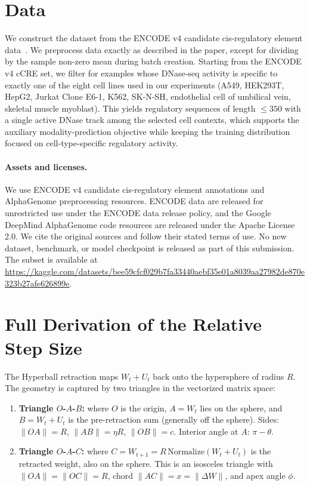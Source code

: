 \documentclass{article}
\begin{document}
\section{Data}
\label{app:data}

We construct the dataset from the ENCODE v4 candidate cis-regulatory element data~\citep{encode-v4}. We preprocess data exactly as described in the paper, except for dividing by the sample non-zero mean during batch creation. Starting from the ENCODE v4 cCRE set, we filter for examples whose DNase-seq activity is specific to exactly one of the eight cell lines used in our experiments (A549, HEK293T, HepG2, Jurkat Clone E6-1, K562, SK-N-SH, endothelial cell of umbilical vein, skeletal muscle myoblast). This yields regulatory sequences of length $\le 350$ with a single active DNase track among the selected cell contexts, which supports the auxiliary modality-prediction objective while keeping the training distribution focused on cell-type-specific regulatory activity.

\paragraph{Assets and licenses.} We use ENCODE v4 candidate cis-regulatory element annotations and AlphaGenome preprocessing resources. ENCODE data are released for unrestricted use under the ENCODE data release policy, and the Google DeepMind AlphaGenome code resources are released under the Apache License 2.0. We cite the original sources and follow their stated terms of use. No new dataset, benchmark, or model checkpoint is released as part of this submission. The subset is available at \url{https://kaggle.com/datasets/bee59cfcf029b7fa33440aebf35e01a8039aa27982de870e323b27afe626899e}.

\section{Full Derivation of the Relative Step Size}
\label{app:derivation}

The Hyperball retraction maps $W_t + U_t$ back onto the hypersphere of radius $R$. The geometry is captured by two triangles in the vectorized matrix space:
\begin{enumerate}
  \item \textbf{Triangle $O$-$A$-$B$:} where $O$ is the origin, $A = W_t$ lies on the sphere, and $B = W_t + U_t$ is the pre-retraction sum (generally off the sphere). Sides: $\|OA\|=R$, $\|AB\|=\eta R$, $\|OB\|=c$. Interior angle at $A$: $\pi-\theta$.
  \item \textbf{Triangle $O$-$A$-$C$:} where $C = W_{t+1} = R\,\mathrm{Normalize}(W_t+U_t)$ is the retracted weight, also on the sphere. This is an isosceles triangle with $\|OA\|=\|OC\|=R$, chord $\|AC\|=x=\|\Delta W\|$, and apex angle $\phi$.
\end{enumerate}
\end{document}
